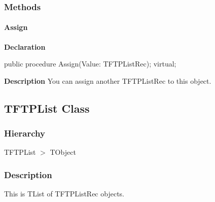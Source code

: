 \documentclass{report}
\newif\ifpdf
\begin{document}
\subsubsection*{\large{\textbf{Methods}}\normalsize\hspace{1ex}\hfill}
\paragraph*{Assign}\hspace*{\fill}

\label{ftpsend.TFTPListRec-Assign}
\begin{list}{}{
\setlength{\itemindent}{0cm}
\setlength{\listparindent}{0cm}
\setlength{\leftmargin}{\evensidemargin}
\addtolength{\leftmargin}{\tmplength}
\settowidth{\labelsep}{X}
\addtolength{\leftmargin}{\labelsep}
\setlength{\labelwidth}{\tmplength}
}
\item[\textbf{Declaration}\hfill]
\ifpdf
\begin{flushleft}
\fi
\begin{ttfamily}
public procedure Assign(Value: TFTPListRec); virtual;\end{ttfamily}

\ifpdf
\end{flushleft}
\fi

\par
\item[\textbf{Description}]
You can assign another TFTPListRec to this object.

\end{list}
\ifpdf
\subsection*{\large{\textbf{TFTPList Class}}\normalsize\hspace{1ex}\hrulefill}
\else
\subsection*{TFTPList Class}
\fi
\label{ftpsend.TFTPList}
\subsubsection*{\large{\textbf{Hierarchy}}\normalsize\hspace{1ex}\hfill}
TFTPList {$>$} TObject
\subsubsection*{\large{\textbf{Description}}\normalsize\hspace{1ex}\hfill}
This is TList of TFTPListRec objects.\hfill\vspace*{1ex}
\end{document}
